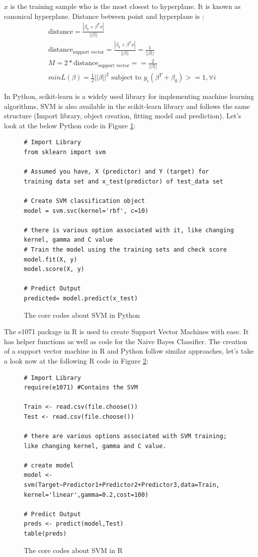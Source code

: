 \documentclass[sigconf]{acmart}
\begin{document}
$x$ is the training sample who is the most closest to hyperplane. It is known as canonical hyperplane. Distance between point and hyperplane is \cite{svm.form}:
\begin{align*}
    & \text{distance}=\frac{|\beta_0 + \beta^Tx|}{||\beta||} \\
    & \text{distance}_{\text{support vector}}=\frac{|\beta_0+\beta^Tx|}{||\beta||}=\frac{1}{||\beta||} \\
    & M=2*\text{distance}_{\text{support vector}}==\frac{2}{||\beta||} \\
    & minL(\beta)=\frac{1}{2}||\beta||^2 \text{ subject to } y_i(\beta^T+ \beta_0)>=1, \forall{i}
\end{align*}

In Python, scikit-learn is a widely used library for implementing machine learning algorithms, SVM is also available in the scikit-learn library and follows the same structure (Import library, object creation, fitting model and prediction). Let's look at the below Python code \cite{svm.code} in Figure \ref{fig:svm_p}:

\begin{figure}[htb]
\centering
\begin{lstlisting}
# Import Library
from sklearn import svm

# Assumed you have, X (predictor) and Y (target) for training data set and x_test(predictor) of test_data set

# Create SVM classification object
model = svm.svc(kernel='rbf', c=10) 

# there is various option associated with it, like changing kernel, gamma and C value
# Train the model using the training sets and check score
model.fit(X, y)
model.score(X, y)

# Predict Output
predicted= model.predict(x_test)
\end{lstlisting}
\caption{The core codes about SVM in Python}\label{fig:svm_p}
\end{figure}

The e1071 package in R is used to create Support Vector Machines with ease. It has helper functions as well as code for the Naive Bayes Classifier. The creation of a support vector machine in R and Python follow similar approaches, let's take a look now at the following R code \cite{svm.code} in Figure \ref{fig:svm_r}:

\begin{figure}[htb]
\centering
\begin{lstlisting}
# Import Library
require(e1071) #Contains the SVM

Train <- read.csv(file.choose())
Test <- read.csv(file.choose())

# there are various options associated with SVM training; like changing kernel, gamma and C value.

# create model
model <- svm(Target~Predictor1+Predictor2+Predictor3,data=Train,
kernel='linear',gamma=0.2,cost=100)

# Predict Output
preds <- predict(model,Test)
table(preds)
\end{lstlisting}
\caption{The core codes about SVM in R}\label{fig:svm_r}
\end{figure}
\end{document}
